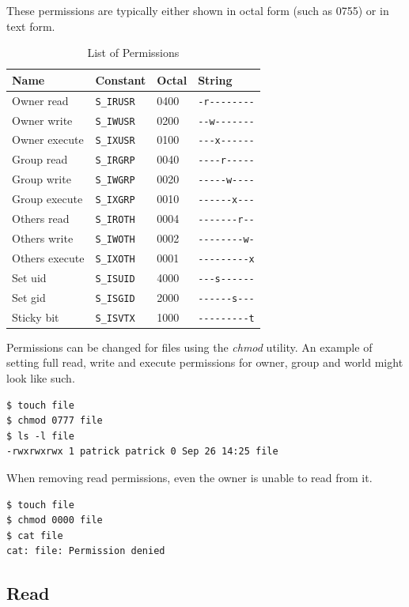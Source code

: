 \documentclass[a4paper]{article}
\begin{document}
These permissions are typically either shown in octal form (such as 0755) or in text form.

\begin{table}[!h]
\centering\caption{List of Permissions}
\begin{tabular}{@{}llll@{}}
\toprule
\textbf{Name} & Constant & \textbf{Octal} & \textbf{String}\\
\midrule
Owner read    & \verb|S_IRUSR| & 0400 & \verb|-r--------|\\
Owner write   & \verb|S_IWUSR| & 0200 & \verb|--w-------|\\
Owner execute & \verb|S_IXUSR| & 0100 & \verb|---x------|\\
\midrule
Group read    & \verb|S_IRGRP| & 0040 & \verb|----r-----|\\
Group write   & \verb|S_IWGRP| & 0020 & \verb|-----w----|\\
Group execute & \verb|S_IXGRP| & 0010 & \verb|------x---|\\
\midrule
Others read   & \verb|S_IROTH| & 0004 & \verb|-------r--|\\
Others write  & \verb|S_IWOTH| & 0002 & \verb|--------w-|\\
Others execute& \verb|S_IXOTH| & 0001 & \verb|---------x|\\
\midrule
Set \gls{uid} & \verb|S_ISUID| & 4000 & \verb|---s------|\\
Set \gls{gid} & \verb|S_ISGID| & 2000 & \verb|------s---|\\
Sticky bit    & \verb|S_ISVTX| & 1000 & \verb|---------t|\\
\bottomrule  
\end{tabular}
\end{table}
Permissions can be changed for files using the \emph{chmod} utility. An example of setting full read, write and execute permissions for owner, group and world might look like such.

\begin{verbatim}
$ touch file
$ chmod 0777 file
$ ls -l file
-rwxrwxrwx 1 patrick patrick 0 Sep 26 14:25 file  
\end{verbatim}
When removing read permissions, even the owner is unable to read from it.

\begin{verbatim}
$ touch file
$ chmod 0000 file
$ cat file
cat: file: Permission denied
\end{verbatim}

\subsection{Read}
\end{document}
